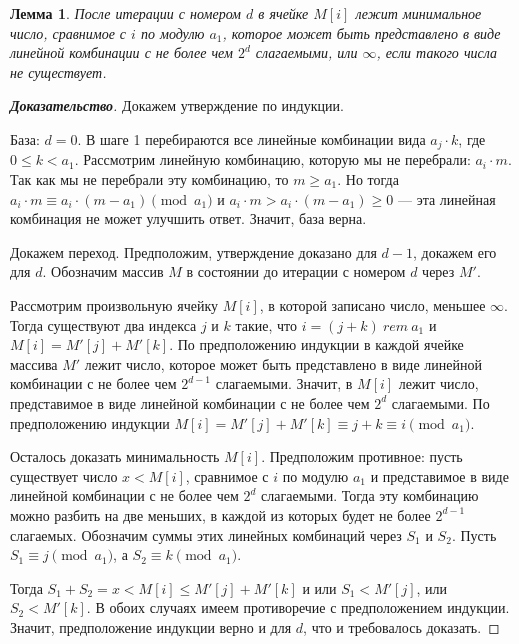 \documentclass[12pt]{article}
\newtheorem{lemma}[theorem]{Лемма}
\begin{document}
\begin{lemma}
\label{algorithm:lemma2}
После итерации с номером $d$ в ячейке $M[i]$ лежит минимальное число, сравнимое с $i$ по модулю $a_1$, которое может быть представлено в виде линейной комбинации с не более чем $2^d$ слагаемыми, или $\infty$, если такого числа не существует.
\end{lemma}
\begin{proof}[\textbf{Доказательство}]
Докажем утверждение по индукции.

База: $d = 0$. В шаге 1 перебираются все линейные комбинации вида $a_j \cdot k$, где $0 \le k < a_1$. Рассмотрим линейную комбинацию, которую мы не перебрали: $a_i \cdot m$. Так как мы не перебрали эту комбинацию, то $m \ge a_1$. Но тогда $a_i \cdot m \equiv a_i \cdot (m - a_1) \pmod {a_1}$ и $a_i \cdot m > a_i \cdot (m - a_1) \ge 0$ --- эта линейная комбинация не может улучшить ответ. Значит, база верна.

Докажем переход. Предположим, утверждение доказано для $d - 1$, докажем его для $d$. Обозначим массив $M$ в состоянии до итерации с номером $d$ через $M'$.

Рассмотрим произвольную ячейку $M[i]$, в которой записано число, меньшее $\infty$. Тогда существуют два индекса $j$ и $k$ такие, что $i = (j + k) \ rem \ a_1$ и $M[i] = M'[j] + M'[k]$. По предположению индукции в каждой ячейке массива $M'$ лежит число, которое может быть представлено в виде линейной комбинации с не более чем $2^{d - 1}$ слагаемыми. Значит, в $M[i]$ лежит число, представимое в виде линейной комбинации с не более чем $2^d$ слагаемыми. По предположению индукции $M[i] = M'[j] + M'[k] \equiv j + k \equiv i \pmod{a_1}$.

Осталось доказать минимальность $M[i]$. Предположим противное: пусть существует число $x < M[i]$, сравнимое с $i$ по модулю $a_1$ и представимое в виде линейной комбинации с не более чем $2^d$ слагаемыми. Тогда эту комбинацию можно разбить на две меньших, в каждой из которых будет не более $2^{d - 1}$ слагаемых. Обозначим суммы этих линейных комбинаций через $S_1$ и $S_2$. Пусть $S_1 \equiv j \pmod{a_1}$, а $S_2 \equiv k \pmod{a_1}$.

Тогда $S_1 + S_2 = x < M[i] \le M'[j] + M'[k]$ и или $S_1 < M'[j]$, или $S_2 < M'[k]$. В обоих случаях имеем противоречие с предположением индукции. Значит, предположение индукции верно и для $d$, что и требовалось доказать.
\end{proof}
\end{document}
